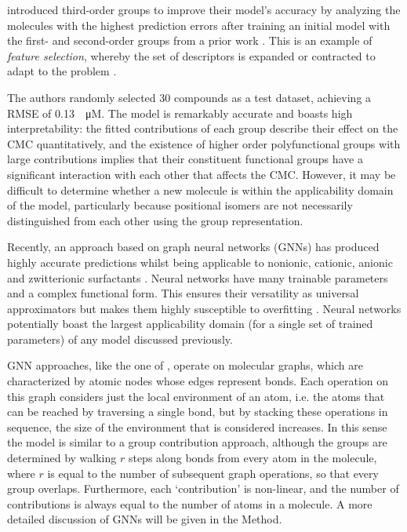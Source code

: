 \citet{matteiModelingCriticalMicelle2013} introduced third-order groups to
improve their model's accuracy by analyzing the molecules with the highest
prediction errors after training an initial model with the first- and
second-order groups from a prior work \cite{ganiAutomaticCreationMissing2005}.
This is an example of \emph{feature selection}, whereby the set of descriptors
is expanded or contracted to adapt to the problem
\cite{liFeatureSelectionData2017,guyonIntroductionVariableFeature2003}.

The authors randomly selected 30 compounds as a test dataset, achieving a RMSE
of \SI{0.13}{\log \micro M}. The model is remarkably accurate and boasts high
interpretability: the fitted contributions of each group describe their effect
on the CMC quantitatively, and the existence of higher order polyfunctional
groups with large contributions implies that their constituent functional groups
have a significant interaction with each other that affects the CMC. However, it
may be difficult to determine whether a new molecule is within the applicability
domain of the model, particularly because positional isomers are not necessarily
distinguished from each other using the group representation.

Recently, an approach based on graph neural networks (GNNs) has produced highly
accurate predictions whilst being applicable to nonionic, cationic, anionic and
zwitterionic surfactants \cite{qinPredictingCriticalMicelle2021}. Neural
networks have many trainable parameters and a complex functional form. This
ensures their versatility as universal approximators but makes them highly
susceptible to overfitting \cite{bejaniSystematicReviewOverfitting2021}. Neural
networks potentially boast the largest applicability domain (for a single set of
trained parameters) of any model discussed previously.

GNN approaches, like the one of \citet{qinPredictingCriticalMicelle2021},
operate on molecular graphs, which are characterized by atomic nodes whose edges
represent bonds. Each operation on this graph considers just the local
environment of an atom, i.e. the atoms that can be reached by traversing a
single bond, but by stacking these operations in sequence, the size of the
environment that is considered increases. In this sense the model is similar to
a group contribution approach, although the groups are determined by walking $r$
steps along bonds from every atom in the molecule, where $r$ is equal to the
number of subsequent graph operations, so that every group overlaps.
Furthermore, each `contribution' is non-linear, and the number of contributions
is always equal to the number of atoms in a molecule. A more detailed discussion
of GNNs will be given in the Method.